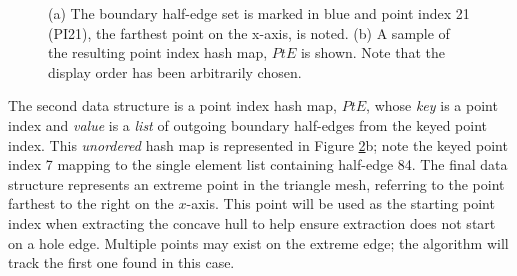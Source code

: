 \begin{figure}[ht]
\begin{subfigure}[t]{.25\linewidth}
    \caption{}
    \label{fig:ch2_hashmap}
  \end{subfigure}
  \caption[Representation of boundary half-edge set, extreme point, and point index hash map]{(a) The boundary half-edge set is marked in blue and point index 21 (PI21), the farthest point on the x-axis, is noted. (b) A sample of the resulting point index hash map, $PtE$ is shown. Note that the display order has been arbitrarily chosen.  }
  \label{fig:ch2_algorithm1_visual} 
\end{figure}

The second data structure is a point index hash map, $PtE$, whose \emph{key} is a point index and \emph{value} is a \emph{list} of outgoing boundary half-edges from the keyed point index. This \emph{unordered} hash map is represented in Figure \ref{fig:ch2_algorithm1_visual}b; note the keyed point index 7 mapping to the single element list containing half-edge 84. The final data structure represents an extreme point in the triangle mesh, referring to the point farthest to the right on the $x$-axis. This point will be used as the starting point index when extracting the concave hull to help ensure extraction does not start on a hole edge. Multiple points may exist on the extreme edge;  the algorithm will track the first one found in this case. 

